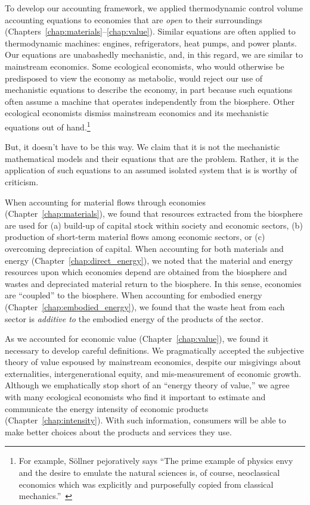 To develop our accounting framework, 
we applied thermodynamic control volume accounting equations 
to economies that are \emph{open} to their surroundings
(Chapters~\ref{chap:materials}--\ref{chap:value}).
Similar equations are often applied to thermodynamic machines:
engines, refrigerators, heat pumps, and power plants.
Our equations are unabashedly mechanistic, 
and, in this regard, we are similar to mainstream economics.
Some ecological economists, 
who would otherwise be predisposed to view the economy as metabolic,
would reject our use of mechanistic equations 
to describe the economy, in part because such equations often assume a 
machine that operates independently from the biosphere.
Other ecological economists dismiss mainstream economics 
and its mechanistic equations out of hand.\footnote{For example, 
	S{\"o}llner pejoratively says 
	``The prime example of physics envy and the desire 
	to emulate the natural sciences is, of course, 
	neoclassical economics which was explicitly and purposefully 
	copied from classical mechanics.''~\cite[p. 178]{Sollner:1997wx}}

But, it doesn't have to be this way.
We claim that it is not the mechanistic mathematical models
and their equations that are the problem.
Rather, it is the application of such equations 
to an assumed isolated system
that is is worthy of criticism.

When accounting for material flows through economies (Chapter~\ref{chap:materials}),
we found that resources extracted from the biosphere are used for 
(a) build-up of capital stock within society and economic sectors, 
(b) production of short-term material flows among economic sectors, or
(c) overcoming depreciation of capital.
When accounting for both materials and energy (Chapter~\ref{chap:direct_energy}),
we noted that the material and energy resources upon which economies depend
are obtained from the biosphere and wastes and depreciated
material return to the biosphere.
In this sense, economies are ``coupled'' to the biosphere.
When accounting for embodied energy (Chapter~\ref{chap:embodied_energy}),
we found that the waste heat from each sector 
is \emph{additive to} the embodied energy of the products of the sector.

As we accounted for economic value 
(Chapter~\ref{chap:value}),
we found it necessary to develop careful definitions.
We pragmatically accepted the subjective theory of value espoused 
by mainstream economics, despite our misgivings 
about externalities, intergenerational equity, 
and mis-measurement of economic growth.
Although we emphatically stop short of an ``energy theory of value,'' %
we agree with many ecological economists
who find it important to estimate and communicate 
the energy intensity of economic products (Chapter~\ref{chap:intensity}).
With such information, consumers will be able to make
better choices about the products and services they use.

